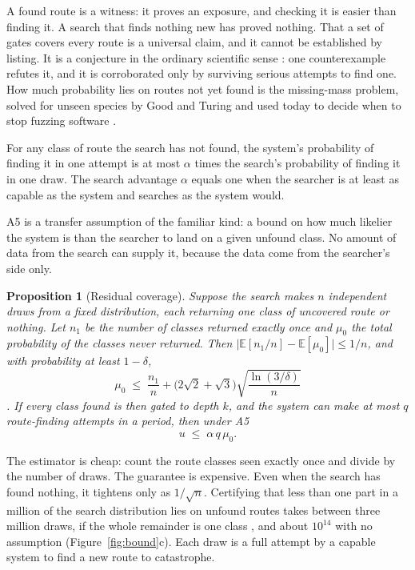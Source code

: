 \documentclass[10pt,twocolumn]{article}
\theoremstyle{plain}
\newtheorem{proposition}{Proposition}
\theoremstyle{definition}
\newcommand{\Ex}{\mathbb{E}}
\begin{document}
A found route is a witness: it proves an exposure, and checking it is easier than finding it.
A search that finds nothing new has proved nothing. That a set of gates covers every route is a
universal claim, and it cannot be established by listing. It is a conjecture in the ordinary
scientific sense \cite{popper1959}: one counterexample refutes it, and it is corroborated
only by surviving serious attempts to find one. How much probability lies on routes not
yet found is the missing-mass problem, solved for unseen species by Good and Turing
\cite{good1953} and used today to decide when to stop fuzzing software \cite{bohme2018}.

\begin{description}[leftmargin=1.3em,labelindent=0pt,itemsep=2pt,topsep=3pt]
\item[A5 (Dominance).] For any class of route the search has not found, the system's
probability of finding it in one attempt is at most $\alpha$ times the search's probability
of finding it in one draw. The search advantage $\alpha$ equals one when the searcher is at
least as capable as the system and searches as the system would.
\end{description}

A5 is a transfer assumption of the familiar kind: a bound on how much likelier the system is
than the searcher to land on a given unfound class. No amount of data from the search can
supply it, because the data come from the searcher's side only.

\begin{proposition}[Residual coverage]\label{prop:gt}
Suppose the search makes $n$ independent draws from a fixed distribution, each returning one
class of uncovered route or nothing. Let $n_{1}$ be the number of classes returned exactly
once and $\mu_{0}$ the total probability of the classes never returned. Then
$\lvert \Ex[n_{1}/n]-\Ex[\mu_{0}]\rvert\le 1/n$, and with probability at least $1-\delta$,
\[
\mu_{0}\;\le\;\frac{n_{1}}{n}+\bigl(2\sqrt{2}+\sqrt{3}\bigr)\sqrt{\frac{\ln(3/\delta)}{n}}
\]
\cite{mcallester2000}. If every class found is then gated to depth $k$, and the system can
make at most $q$ route-finding attempts in a period, then under A5
\[
u\;\le\;\alpha\,q\,\mu_{0}.
\]
\end{proposition}

The estimator is cheap: count the route classes seen exactly once and divide by the number of
draws. The guarantee is expensive. Even when the search has found nothing, it tightens only
as $1/\sqrt{n}$. Certifying that less than one part in a million of the search distribution
lies on unfound routes takes between three million draws, if the whole remainder is one class
\cite{hanley1983}, and about $10^{14}$ with no assumption (Figure~\ref{fig:bound}c). Each
draw is a full attempt by a capable system to find a new route to catastrophe.
\end{document}
